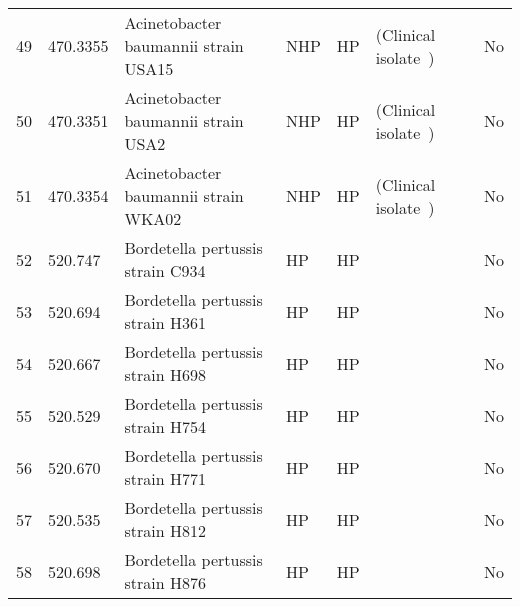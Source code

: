 \begin{tabular}{llllllll}
49  &    470.3355 &                              Acinetobacter baumannii strain USA15 &           NHP &              HP &                         (Clinical isolate~\cite{yoon2017bla}) &                                  &            No \\
50  &    470.3351 &                               Acinetobacter baumannii strain USA2 &           NHP &              HP &                         (Clinical isolate~\cite{yoon2017bla}) &                                  &            No \\
51  &    470.3354 &                              Acinetobacter baumannii strain WKA02 &           NHP &              HP &                         (Clinical isolate~\cite{yoon2017bla}) &                                  &            No \\
52  &     520.747 &                                  Bordetella pertussis strain C934 &            HP &              HP &                                       \cite{bowden2016genome} &                                  &            No \\
53  &     520.694 &                                  Bordetella pertussis strain H361 &            HP &              HP &                                       \cite{bowden2016genome} &                                  &            No \\
54  &     520.667 &                                  Bordetella pertussis strain H698 &            HP &              HP &                                       \cite{bowden2016genome} &                                  &            No \\
55  &     520.529 &                                  Bordetella pertussis strain H754 &            HP &              HP &                                       \cite{bowden2016genome} &                                  &            No \\
56  &     520.670 &                                  Bordetella pertussis strain H771 &            HP &              HP &                                       \cite{bowden2016genome} &                                  &            No \\
57  &     520.535 &                                  Bordetella pertussis strain H812 &            HP &              HP &                                       \cite{bowden2016genome} &                                  &            No \\
58  &     520.698 &                                  Bordetella pertussis strain H876 &            HP &              HP &                                       \cite{bowden2016genome} &                                  &            No \\

\end{tabular}
